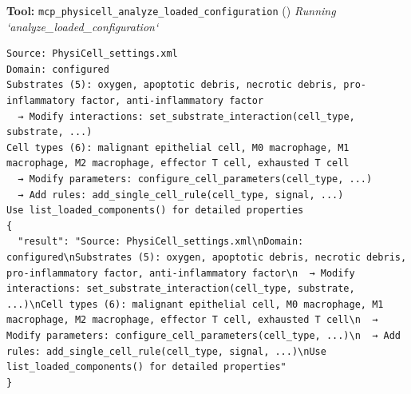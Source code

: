 \documentclass[11pt,a4paper]{article}
\begin{document}
\begin{toolokbox}
\textbf{Tool:} \texttt{mcp\_physicell\_analyze\_loaded\_configuration} (\checkmark)
\textit{Running `analyze\_loaded\_configuration`}
\begin{lstlisting}
Source: PhysiCell_settings.xml
Domain: configured
Substrates (5): oxygen, apoptotic debris, necrotic debris, pro-inflammatory factor, anti-inflammatory factor
  → Modify interactions: set_substrate_interaction(cell_type, substrate, ...)
Cell types (6): malignant epithelial cell, M0 macrophage, M1 macrophage, M2 macrophage, effector T cell, exhausted T cell
  → Modify parameters: configure_cell_parameters(cell_type, ...)
  → Add rules: add_single_cell_rule(cell_type, signal, ...)
Use list_loaded_components() for detailed properties
{
  "result": "Source: PhysiCell_settings.xml\nDomain: configured\nSubstrates (5): oxygen, apoptotic debris, necrotic debris, pro-inflammatory factor, anti-inflammatory factor\n  → Modify interactions: set_substrate_interaction(cell_type, substrate, ...)\nCell types (6): malignant epithelial cell, M0 macrophage, M1 macrophage, M2 macrophage, effector T cell, exhausted T cell\n  → Modify parameters: configure_cell_parameters(cell_type, ...)\n  → Add rules: add_single_cell_rule(cell_type, signal, ...)\nUse list_loaded_components() for detailed properties"
}
\end{lstlisting}
\end{toolokbox}
\end{document}
